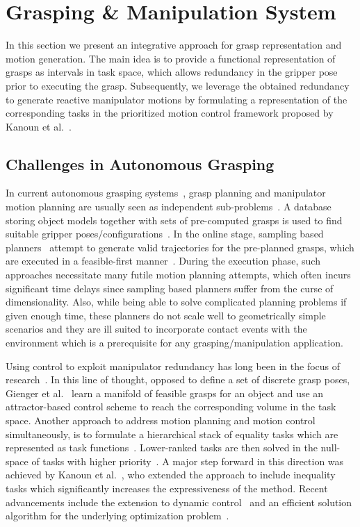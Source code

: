 \section{Grasping \& Manipulation System}
\label{sec:manip}
%
In this section we present an integrative approach for grasp representation and motion
generation. The main idea is to provide a functional representation of grasps as intervals in task
space, which allows redundancy in the gripper pose prior to executing the grasp. Subsequently, we
leverage the obtained redundancy to generate reactive manipulator motions by formulating a
representation of the corresponding tasks in the prioritized motion control framework proposed by
Kanoun et al.~\cite{Kano11}.
%
\subsection{Challenges in Autonomous Grasping}
\label{subsec:Grasping_challenges}
%
In current autonomous grasping systems~\cite{Bere07, Srin10, Krug14a}, grasp planning and
manipulator motion planning are usually seen as independent sub-problems~\cite{Dian10}. A database
storing object models together with sets of pre-computed grasps is used to find suitable gripper
poses/configurations~\cite{Mill04, Gold11, Krug14a}. In the online stage, sampling based
planners~\cite{LaVa06} attempt to generate valid trajectories for the pre-planned grasps, which are
executed in a feasible-first manner~\cite{Bere07}. During the execution phase, such approaches
necessitate many futile motion planning attempts, which often incurs significant time delays since
sampling based planners suffer from the curse of dimensionality. Also, while being able to solve
complicated planning problems if given enough time, these planners do not scale well to
geometrically simple scenarios and they are ill suited to incorporate contact events with the
environment which is a prerequisite for any grasping/manipulation application.

Using control to exploit manipulator redundancy has long been in the focus of research~\cite{Sici91,
  Sent10}. In this line of thought, opposed to define a set of discrete grasp poses, Gienger et
al.~\cite{Gien08a, Gien08b} learn a manifold of feasible grasps for an object and use an
attractor-based control scheme to reach the corresponding volume in the task space. Another approach
to address motion planning and motion control simultaneously, is to formulate a hierarchical stack
of equality tasks which are represented as task functions~\cite{Sams91}. Lower-ranked tasks are then
solved in the null-space of tasks with higher priority~\cite{Sici91, Sent10}. A major step forward
in this direction was achieved by Kanoun et al.~\cite{Kano11}, who extended the approach to include
inequality tasks which significantly increases the expressiveness of the method. Recent advancements
include the extension to dynamic control~\cite{Saab13} and an efficient solution algorithm for the
underlying optimization problem~\cite{Esca14}.
%
